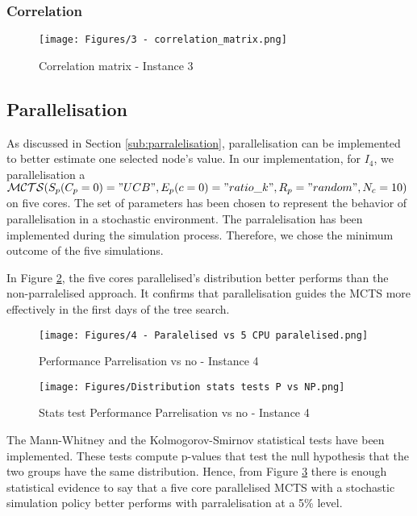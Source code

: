 \subsubsection*{Correlation}
\begin{figure}[!ht]
    \centering
    \texttt{[image: Figures/3 - correlation\_matrix.png]}
    \caption{Correlation matrix - Instance 3}
    \label{fig:corr_3}
\end{figure}
\newpage
\newpage
\subsection{Parallelisation}
As discussed in Section \ref{sub:parralelisation}, parallelisation can be implemented to better estimate one selected node's value.
In our implementation, for $I_4$, we parallelisation a $\mathcal{MCTS}(S_p(C_p=0)="UCB",E_p(c=0)="ratio\_k",R_p="random",N_c=10)$ on five cores. The set of parameters has been chosen to represent the behavior of parallelisation in a stochastic environment.  The parralelisation has been implemented during the simulation process. Therefore, we chose the minimum outcome of the five simulations.

In Figure \ref{fig:sim_perf_parral_4}, the five cores parallelised's distribution better performs than the non-parralelised approach. It confirms that parallelisation guides the MCTS more effectively in the first days of the tree search.

\begin{figure}[!ht]
    \centering
    \texttt{[image: Figures/4 - Paralelised vs 5 CPU paralelised.png]}
    \caption{Performance Parrelisation vs no - Instance 4}
    \label{fig:sim_perf_parral_4}
\end{figure}

\begin{figure}[!ht]
    \centering
    \texttt{[image: Figures/Distribution stats tests P vs NP.png]}
    \caption{Stats test Performance Parrelisation vs no - Instance 4}
    \label{fig:stats test parralel}
\end{figure}
The Mann-Whitney and the Kolmogorov-Smirnov statistical tests have been implemented. These tests compute p-values that test the null hypothesis that the two groups have the same distribution. Hence, from Figure \ref{fig:stats test parralel} there is enough statistical evidence to say that a five core parallelised MCTS with a stochastic simulation policy better performs with parralelisation at a 5\% level.

